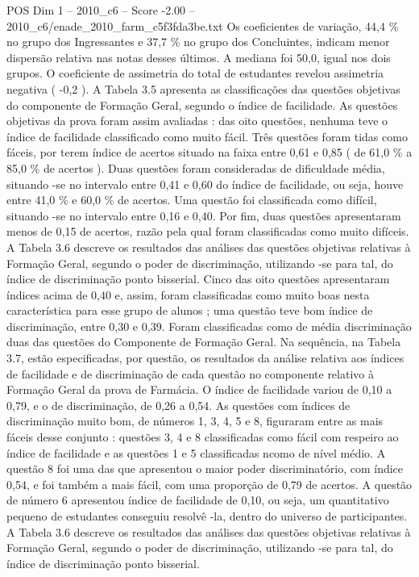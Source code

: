 \begin{textsample}{POS Dim 1 – 2010\_c6 – Score -2.00 – 2010\_c6/enade\_2010\_farm\_c5f3fda3be.txt}
Os coeficientes de variação, 44,4 \% no grupo dos Ingressantes e 37,7 \% no grupo dos Concluintes, indicam menor dispersão relativa nas notas desses últimos.
A mediana foi 50,0, igual nos dois grupos.
O coeficiente de assimetria do total de estudantes revelou assimetria negativa ( -0,2 ).
A Tabela 3.5 apresenta as classificações das questões objetivas do componente de Formação Geral, segundo o índice de facilidade.
As questões objetivas da prova foram assim avaliadas : das oito questões, nenhuma teve o índice de facilidade classificado como muito fácil.
Três questões foram tidas como fáceis, por terem índice de acertos situado na faixa entre 0,61 e 0,85 ( de 61,0 \% a 85,0 \% de acertos ).
Duas questões foram consideradas de dificuldade média, situando -se no intervalo entre 0,41 e 0,60 do índice de facilidade, ou seja, houve entre 41,0 \% e 60,0 \% de acertos.
Uma questão foi classificada como difícil, situando -se no intervalo entre 0,16 e 0,40.
Por fim, duas questões apresentaram menos de 0,15 de acertos, razão pela qual foram classificadas como muito difíceis.
A Tabela 3.6 descreve os resultados das análises das questões objetivas relativas à Formação Geral, segundo o poder de discriminação, utilizando -se para tal, do índice de discriminação ponto bisserial.
Cinco das oito questões apresentaram índices acima de 0,40 e, assim, foram classificadas como muito boas nesta característica para esse grupo de alunos ; uma questão teve bom índice de discriminação, entre 0,30 e 0,39.
Foram classificadas como de média discriminação duas das questões do Componente de Formação Geral.
Na sequência, na Tabela 3.7, estão especificadas, por questão, os resultados da análise relativa aos índices de facilidade e de discriminação de cada questão no componente relativo à Formação Geral da prova de Farmácia.
O índice de facilidade variou de 0,10 a 0,79, e o de discriminação, de 0,26 a 0,54.
As questões com índices de discriminação muito bom, de números 1, 3, 4, 5 e 8, figuraram entre as mais fáceis desse conjunto : questões 3, 4 e 8 classificadas como fácil com respeiro ao índice de facilidade e as questões 1 e 5 classificadas ncomo de nível médio.
A questão 8 foi uma das que apresentou o maior poder discriminatório, com índice 0,54, e foi também a mais fácil, com uma proporção de 0,79 de acertos.
A questão de número 6 apresentou índice de facilidade de 0,10, ou seja, um quantitativo pequeno de estudantes conseguiu resolvê -la, dentro do universo de participantes.
A Tabela 3.6 descreve os resultados das análises das questões objetivas relativas à Formação Geral, segundo o poder de discriminação, utilizando -se para tal, do índice de discriminação ponto bisserial.

\end{textsample}

